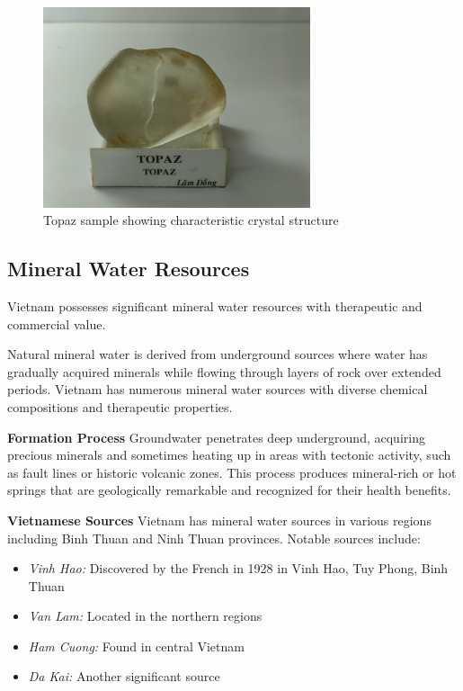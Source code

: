 \begin{figure}[H]
\centering
\includegraphics[width=0.7\textwidth]{graphics/topaz.jpg}
\caption{Topaz sample showing characteristic crystal structure}
\label{fig:topaz}
\end{figure}



\subsection{Mineral Water Resources}

Vietnam possesses significant mineral water resources with therapeutic and commercial value.

Natural mineral water is derived from underground sources where water has gradually acquired minerals while flowing through layers of rock over extended periods. Vietnam has numerous mineral water sources with diverse chemical compositions and therapeutic properties.

\textbf{Formation Process}
Groundwater penetrates deep underground, acquiring precious minerals and sometimes heating up in areas with tectonic activity, such as fault lines or historic volcanic zones. This process produces mineral-rich or hot springs that are geologically remarkable and recognized for their health benefits.

\textbf{Vietnamese Sources}
Vietnam has mineral water sources in various regions including Binh Thuan and Ninh Thuan provinces. Notable sources include:
\begin{itemize}
\item \textit{Vinh Hao:} Discovered by the French in 1928 in Vinh Hao, Tuy Phong, Binh Thuan
\item \textit{Van Lam:} Located in the northern regions
\item \textit{Ham Cuong:} Found in central Vietnam
\item \textit{Da Kai:} Another significant source
\end{itemize}

